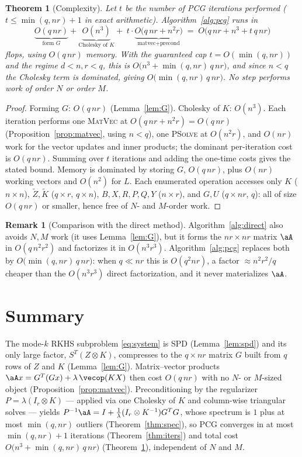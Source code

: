 \documentclass[12pt]{article}
\newtheorem{theorem}{Theorem}
\theoremstyle{definition}
\newtheorem{remark}{Remark}
\begin{document}
\begin{theorem}[Complexity]\label{thm:complexity}
Let $t$ be the number of PCG iterations performed
($t\le\min(q,nr)+1$ in exact arithmetic). Algorithm~\ref{alg:pcg} runs in
\[
\underbrace{O(q\,nr)}_{\text{form }G}
+\underbrace{O(n^{3})}_{\text{Cholesky of }K}
+\;t\cdot\underbrace{O\big(q\,nr+n^{2}r\big)}_{\text{matvec}+\text{precond}}
\;=\;O\!\big(q\,nr+n^{3}+t\,q\,nr\big)
\]
flops, using $O(q\,nr)$ memory. With the guaranteed cap $t=O(\min(q,nr))$ and
the regime $d<n,r<q$, this is $O\big(n^3+\min(q,nr)\,q\,nr\big)$, and since
$n<q$ the Cholesky term is dominated, giving $O\big(\min(q,nr)\,q\,nr\big)$.
No step performs work of order $N$ or order $M$.
\end{theorem}
\begin{proof}
Forming $G$: $O(q\,nr)$ (Lemma~\ref{lem:G}). Cholesky of $K$: $O(n^3)$.
Each iteration performs one \textsc{MatVec} at $O(q\,nr+n^2r)=O(q\,nr)$
(Proposition~\ref{prop:matvec}, using $n<q$), one \textsc{PSolve} at $O(n^2r)$,
and $O(nr)$ work for the vector updates and inner products; the dominant
per-iteration cost is $O(q\,nr)$. Summing over $t$ iterations and adding the
one-time costs gives the stated bound. Memory is dominated by storing $G$,
$O(q\,nr)$, plus $O(nr)$ working vectors and $O(n^2)$ for $L$. Each enumerated
operation accesses only $K$ ($n\times n$), $\tilde Z,\tilde K$ ($q\times r$,
$q\times n$), $B,X,R,P,Q,Y$ ($n\times r$), and $G,U$ ($q\times nr$, $q$): all of
size $O(q\,nr)$ or smaller, hence free of $N$- and $M$-order work.
\end{proof}

\begin{remark}[Comparison with the direct method]
Algorithm~\ref{alg:direct} also avoids $N,M$ work (it uses
Lemma~\ref{lem:G}), but it forms the $nr\times nr$ matrix $\aA$ in
$O(q\,n^2r^2)$ and factorizes it in $O(n^3r^3)$. Algorithm~\ref{alg:pcg}
replaces both by $O\big(\min(q,nr)\,q\,nr\big)$: when $q\ll nr$ this is
$O(q^2 nr)$, a factor $\approx n^2r^2/q$ cheaper than the
$O(n^3r^3)$ direct factorization, and it never materializes $\aA$.
\end{remark}

\section{Summary}
The mode-$k$ RKHS subproblem \eqref{eq:system} is SPD (Lemma~\ref{lem:spd}) and
its only large factor, $S^{T}(Z\otimes K)$, compresses to the
$q\times nr$ matrix $G$ built from $q$ rows of $Z$ and $K$ (Lemma~\ref{lem:G}).
Matrix--vector products $\aA x=G^{T}(Gx)+\lambda\,\vecop(KX)$ then cost
$O(q\,nr)$ with no $N$- or $M$-sized object (Proposition~\ref{prop:matvec}).
Preconditioning by the regularizer $P=\lambda(I_r\otimes K)$ — applied via one
Cholesky of $K$ and column-wise triangular solves — yields
$P^{-1}\aA=I+\tfrac1\lambda(I_r\otimes K^{-1})G^{T}G$, whose spectrum is $1$
plus at most $\min(q,nr)$ outliers (Theorem~\ref{thm:spec}), so PCG converges in
at most $\min(q,nr)+1$ iterations (Theorem~\ref{thm:iters}) and total cost
$O\big(n^3+\min(q,nr)\,q\,nr\big)$ (Theorem~\ref{thm:complexity}), independent
of $N$ and $M$.
\end{document}
